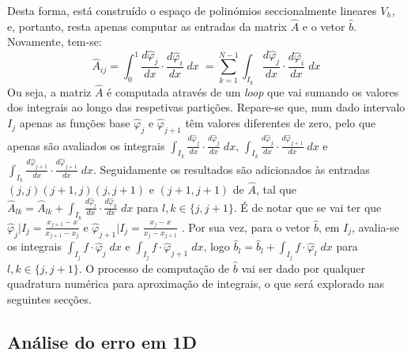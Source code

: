 \documentclass{article}
\theoremstyle{definition}
\theoremstyle{plain}
\numberwithin{equation}{section}
\begin{document}
Desta forma, está construído o espaço de polinómios seccionalmente lineares $V_h$, e, portanto, resta apenas computar as entradas da matrix $\hat{A}$ e o vetor $\hat{b}$. Novamente, tem-se:
\begin{equation*}
    \hat{A}_{ij}=\int_{0}^{1} \frac{d\hat{\varphi}_j}{dx} \cdot \frac{d\hat{\varphi}_i}{dx} \; dx \; =\sum_{k=1}^{N-1}\int_{I_k} \frac{d\hat{\varphi}_j}{dx} \cdot \frac{d\hat{\varphi}_i}{dx} \;dx
\end{equation*}
 Ou seja, a matriz $\hat{A}$ é computada através de um \emph{loop} que vai sumando os valores dos integrais ao longo das respetivas partições. Repare-se que, num dado intervalo $I_j$ apenas as funções base $\hat{\varphi}_j$ e $\hat{\varphi}_{j+1}$ têm valores diferentes de zero, pelo que apenas são avaliados os integrais $\int_{I_k} \frac{d\hat{\varphi}_j}{dx} \cdot \frac{d\hat{\varphi}_j}{dx} \;dx$, $\int_{I_k} \frac{d\hat{\varphi}_j}{dx} \cdot \frac{d\hat{\varphi}_{j+1}}{dx} \;dx$ e $\int_{I_k} \frac{d\hat{\varphi}_{j+1}}{dx} \cdot \frac{d\hat{\varphi}_{j+1}}{dx}\;dx$. Seguidamente os resultados são adicionados  às entradas $(j,j) (j+1,j) (j,j+1)$ e $(j+1,j+1)$ de $\hat{A}$, tal que $\hat{A}_{lk}=\hat{A}_{lk}+\int_{I_k}\frac{d\hat{\varphi}_l}{dx} \cdot \frac{d\hat{\varphi}_{k}}{dx} \;dx$ para $l,k \in \{j,j+1\}$. É de notar que se vai ter que $\hat{\varphi}_j|I_j=\frac{x_{j+1}-x}{x_{j+1}-x_j}$ e $\hat{\varphi}_{j+1}|I_j=\frac{x_{j}-x}{x_{j}-x_{j+1}}$ . Por sua vez, para o vetor $\hat{b}$, em $I_j$, avalia-se os integrais $\int_{I_j}f \cdot \hat{\varphi}_j \; dx$ e $\int_{I_j}f \cdot \hat{\varphi}_{j+1} \; dx$, logo $\hat{b}_{l}=\hat{b}_{l}+\int_{I_j}f \cdot \hat{\varphi}_l \; dx$ para $l,k \in \{j,j+1\}$. O processo de computação de $\hat{b}$ vai ser dado por qualquer quadratura numérica para aproximação de integrais, o que será explorado nas seguintes secções.
\subsection{Análise do erro em 1D}
\end{document}
